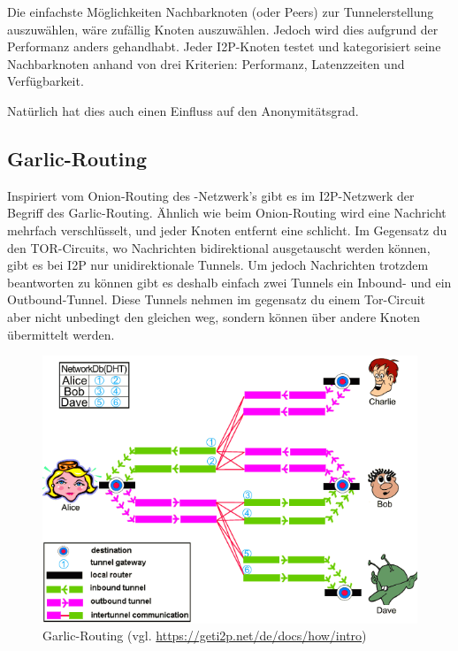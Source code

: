 Die einfachste Möglichkeiten Nachbarknoten (oder Peers) zur Tunnelerstellung auszuwählen, wäre zufällig Knoten auszuwählen. 
Jedoch wird dies aufgrund der Performanz anders gehandhabt.
Jeder I2P-Knoten testet und kategorisiert seine Nachbarknoten anhand von drei Kriterien:
Performanz, Latenzzeiten und Verfügbarkeit.

Natürlich hat dies auch einen Einfluss auf den Anonymitätsgrad.
\parencite[S.~4-5]{timpanaro_monitoring_nodate}

\subsection{Garlic-Routing}\label{sec:garlic_routing}

Inspiriert vom Onion-Routing des -Netzwerk's gibt es im I2P-Netzwerk der Begriff des Garlic-Routing.
Ähnlich wie beim Onion-Routing wird eine Nachricht mehrfach verschlüsselt, und jeder Knoten entfernt eine schlicht.
Im Gegensatz du den TOR-Circuits, wo Nachrichten bidirektional ausgetauscht werden können, gibt es bei I2P nur unidirektionale Tunnels.
Um jedoch Nachrichten trotzdem beantworten zu können gibt es deshalb einfach zwei Tunnels ein Inbound- und ein Outbound-Tunnel.
Diese Tunnels nehmen im gegensatz du einem Tor-Circuit aber nicht unbedingt den gleichen weg, sondern können über andere Knoten übermittelt werden.

\begin{figure}[H]
    \includegraphics[width=\textwidth]{img/i2prouting.png}
    \caption{Garlic-Routing (vgl. \url{https://geti2p.net/de/docs/how/intro})}
\end{figure}

